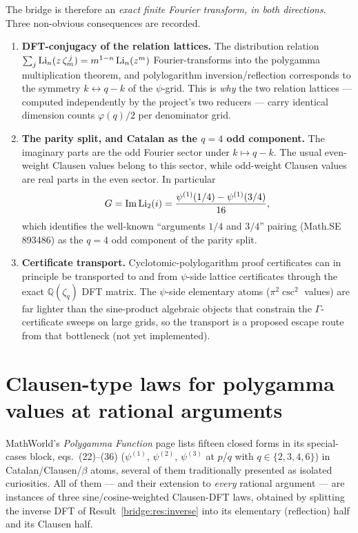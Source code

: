 The bridge is therefore an \emph{exact finite Fourier transform, in both directions}.
Three non-obvious consequences are recorded.

\begin{enumerate}
\item \textbf{DFT-conjugacy of the relation lattices.} The distribution relation
$\sum_{j}\operatorname{Li}_n(z\,\zeta_m^{\,j})=m^{1-n}\operatorname{Li}_n(z^m)$ Fourier-transforms into the polygamma
multiplication theorem, and polylogarithm inversion/reflection corresponds to the symmetry
$k\leftrightarrow q-k$ of the $\psi$-grid. This is \emph{why} the two relation lattices ---
computed independently by the project's two reducers --- carry identical dimension counts
$\varphi(q)/2$ per denominator grid.
\item \textbf{The parity split, and Catalan as the $q=4$ odd component.} The imaginary parts are the odd Fourier sector under $k\mapsto q-k$.
The usual even-weight Clausen values belong to this sector, while odd-weight
Clausen values are real parts in the even sector. In particular
\[
G=\operatorname{Im}\operatorname{Li}_2(i)=\frac{\psi^{(1)}(1/4)-\psi^{(1)}(3/4)}{16},
\]
which identifies the well-known ``arguments $1/4$ and $3/4$'' pairing (Math.SE 893486) as
the $q=4$ odd component of the parity split.
\item \textbf{Certificate transport.} Cyclotomic-polylogarithm proof certificates can in
principle be transported to and from $\psi$-side lattice certificates through the exact
$\mathbb{Q}(\zeta_q)$ DFT matrix. The $\psi$-side elementary atoms ($\pi^2\csc^2$ values)
are far lighter than the sine-product algebraic objects that constrain the
$\Gamma$-certificate sweeps on large grids, so the transport is a proposed escape route
from that bottleneck (not yet implemented).
\end{enumerate}

\section{Clausen-type laws for polygamma values at rational arguments}\label{bridge:sec:laws}

MathWorld's \emph{Polygamma Function} page lists fifteen closed forms in its
special-cases block, eqs.~(22)--(36) ($\psi^{(1)}$, $\psi^{(2)}$, $\psi^{(3)}$ at $p/q$
with $q\in\{2,3,4,6\}$) in Catalan/Clausen/$\beta$ atoms, several of them traditionally
presented as isolated curiosities. All of them ---
and their extension to \emph{every} rational argument --- are instances of three
sine/cosine-weighted Clausen-DFT laws, obtained by splitting the inverse DFT of
Result~\ref{bridge:res:inverse} into its elementary (reflection) half and its Clausen half.

